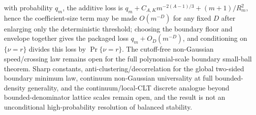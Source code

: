 \documentclass[11pt]{article}
\begin{document}
with probability \(q_m\), the additive loss is
\(q_m+C_{A,K}m^{-2(A-1)/3}+(m+1)/R_m^2\), hence the coefficient-size term may be
made \(O(m^{-D})\) for any fixed \(D\) after enlarging only the deterministic
threshold; choosing the boundary floor and envelope together gives the packaged
loss \(q_m+O_D(m^{-D})\), and conditioning on \(\{\nu=r\}\) divides this loss by
\(\Pr\{\nu=r\}\).  The
cutoff-free non-Gaussian speed/crossing law remains open for the full
polynomial-scale boundary small-ball theorem.  Sharp
constants, anti-clustering/decorrelation for the global two-sided boundary
minimum law, continuum non-Gaussian universality at full bounded-density
generality, and the continuum/local-CLT discrete analogue beyond
bounded-denominator lattice scales remain open, and the result is not an
unconditional high-probability resolution of balanced stability.
\end{document}
